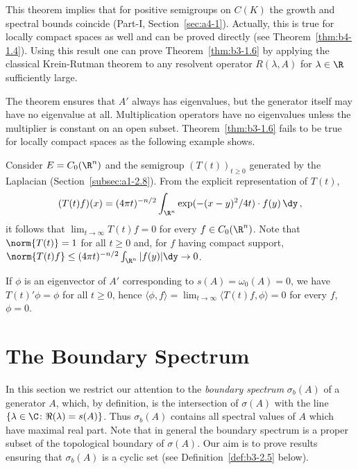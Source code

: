 This theorem implies that for positive semigroups on $C(K)$ the growth and spectral bounds coincide (\cf Part-I, Section~\ref{sec:a4-1}).
Actually, this is true for locally compact spaces as well and can be proved directly (see Theorem~\ref{thm:b4-1.4}).
Using this result one can prove Theorem~\ref{thm:b3-1.6} by applying the classical Krein-Rutman theorem to any resolvent operator $R(\lambda,A)$ for $\lambda \in \R$ sufficiently large.

The theorem ensures that $A'$ always has eigenvalues, but the generator itself may have no eigenvalue at all.
Multiplication operators have no eigenvalues unless the multiplier is constant on an open subset.
Theorem~\ref{thm:b3-1.6} fails to be true for locally compact spaces as the following example shows.
\begin{example}\label{ex:b3-1.7}
	Consider $E = C_{0}(\R^{n})$ and the semigroup $(T(t))_{t \geq 0}$ generated by the Laplacian (\cf Section~\ref{subsec:a1-2.8}).
From the explicit representation of\/ $T(t)$,
	\begin{equation}\label{eq:b3-1.17}
		(T(t)f)(x) = (4\pi t)^{-n/2}\int_{\R^{n}} \exp(-(x-y)^{2}/4t)\cdot f(y) \, \dy \,,
	\end{equation}
	it follows that $\lim_{t \to \infty}T(t)f = 0$ for every $f \in C_{0}(\R^{n})$. Note that $\norm{T(t)} = 1$ for all $t \geq 0$ and, for $f$ having compact support,      
    $\norm{T(t)f} \leq (4\pi t)^{-n/2}\int_{\R^{n}} |f(y)| \dy \to 0$. 
    	
	If\/ $\phi$ is an eigenvector of\/ $A'$ corresponding to $s(A) = \omega_{0}(A) = 0$, we have $T(t)'\phi = \phi$ for all $t \geq 0$, hence $\langle \phi,f \rangle = \lim_{t \to \infty}\langle T(t)f,\phi \rangle = 0$ for every $f$, \ie $\phi = 0$.
\end{example}
\section{The Boundary Spectrum}\label{sec:b3-2}%
In this section we restrict our attention to the \emph{boundary spectrum}%
$\sigma_{b}(A)$ of a generator $A$, which, by definition, is the intersection of\/ $\sigma(A)$ with the line $\{\lambda \in \C \colon \Re(\lambda) = s(A)\}$.
Thus $\sigma_{b}(A)$ contains all spectral values of\/ $A$ which have maximal real part.
Note that in general the boundary spectrum is a proper subset of the topological boundary of\/ $\sigma(A)$.
Our aim is to prove results ensuring that $\sigma_{b}(A)$ is a cyclic set (see Definition~\ref{def:b3-2.5} below).

